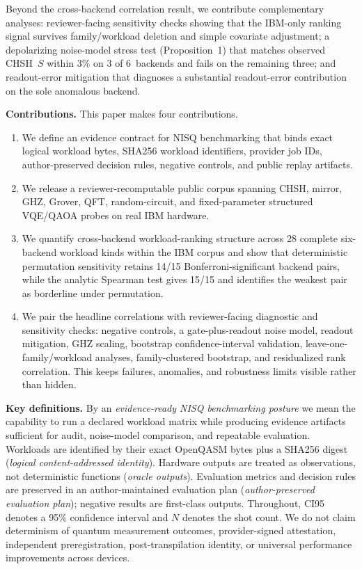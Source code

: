 \documentclass[aps,prxquantum,twocolumn,superscriptaddress,amsmath,amssymb,longbibliography,floatfix]{revtex4-2}
\begin{document}
Beyond the cross-backend correlation result, we contribute complementary analyses: reviewer-facing sensitivity checks showing that the IBM-only ranking signal survives family/workload deletion and simple covariate adjustment; a depolarizing noise-model stress test (Proposition~1) that matches observed CHSH~$S$ within 3\% on 3 of 6~backends and fails on the remaining three; and readout-error mitigation that diagnoses a substantial readout-error contribution on the sole anomalous backend.

\textbf{Contributions.} This paper makes four contributions.
\begin{enumerate}
  \item We define an evidence contract for NISQ benchmarking that binds exact logical workload bytes, SHA256 workload identifiers, provider job IDs, author-preserved decision rules, negative controls, and public replay artifacts.
  \item We release a reviewer-recomputable public corpus spanning CHSH, mirror, GHZ, Grover, QFT, random-circuit, and fixed-parameter structured VQE/QAOA probes on real IBM hardware.
  \item We quantify cross-backend workload-ranking structure across 28 complete six-backend workload kinds within the IBM corpus and show that deterministic permutation sensitivity retains 14/15 Bonferroni-significant backend pairs, while the analytic Spearman test gives 15/15 and identifies the weakest pair as borderline under permutation.
  \item We pair the headline correlations with reviewer-facing diagnostic and sensitivity checks: negative controls, a gate-plus-readout noise model, readout mitigation, GHZ scaling, bootstrap confidence-interval validation, leave-one-family/workload analyses, family-clustered bootstrap, and residualized rank correlation. This keeps failures, anomalies, and robustness limits visible rather than hidden.
\end{enumerate}

\textbf{Key definitions.} By an \emph{evidence-ready NISQ benchmarking posture} we mean the capability to run a declared workload matrix while producing evidence artifacts sufficient for audit, noise-model comparison, and repeatable evaluation. Workloads are identified by their exact OpenQASM bytes plus a SHA256 digest (\emph{logical content-addressed identity}). Hardware outputs are treated as observations, not deterministic functions (\emph{oracle outputs}). Evaluation metrics and decision rules are preserved in an author-maintained evaluation plan (\emph{author-preserved evaluation plan}); negative results are first-class outputs. Throughout, CI95 denotes a 95\% confidence interval and $N$ denotes the shot count. We do not claim determinism of quantum measurement outcomes, provider-signed attestation, independent preregistration, post-transpilation identity, or universal performance improvements across devices.
\end{document}
